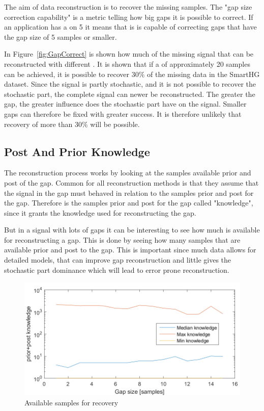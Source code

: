 The aim of data reconstruction is to recover the missing samples. The "gap size correction capability" is a metric telling how big gaps it is possible to correct. If an application has a  on 5 it means that is is capable of correcting gaps that have the gap size of 5 samples or smaller. 

In Figure~\ref{fig:GapCorrect} is shown how much of the missing signal that can be reconstructed with different . It is shown that if a  of approximately 20 samples can be achieved, it is possible to recover $30\%$ of the missing data in the SmartHG dataset. Since the signal is partly stochastic, and it is not possible to recover the stochastic part, the complete signal can newer be reconstructed. The greater the gap, the greater influence does the stochastic part have on the signal. Smaller gaps can therefore be fixed with greater success. It is therefore unlikely that recovery of more than $30\%$ will be possible. 

\subsection{Post And Prior Knowledge}
The reconstruction process works by looking at the samples available prior and post of the gap. Common for all reconstruction methods is that they assume that the signal in the gap must behaved in relation to the samples prior and post for the gap. Therefore is the samples prior and post for the gap called "knowledge", since it grants the knowledge used for reconstructing the gap. 

But in a signal with lots of gaps it can be interesting to see how much  is available for reconstructing a gap. This is done by seeing how many samples that are available prior and post to the gap. This is important since much data allows for detailed models, that can improve gap reconstruction and little  gives the stochastic part dominance which will lead to error prone reconstruction. 

\begin{figure}[H]
\centering
\includegraphics[width=0.7\linewidth]{billeder/GapInfo2.png}\caption{Available samples for recovery}
\label{fig:PAF}
\end{figure}

